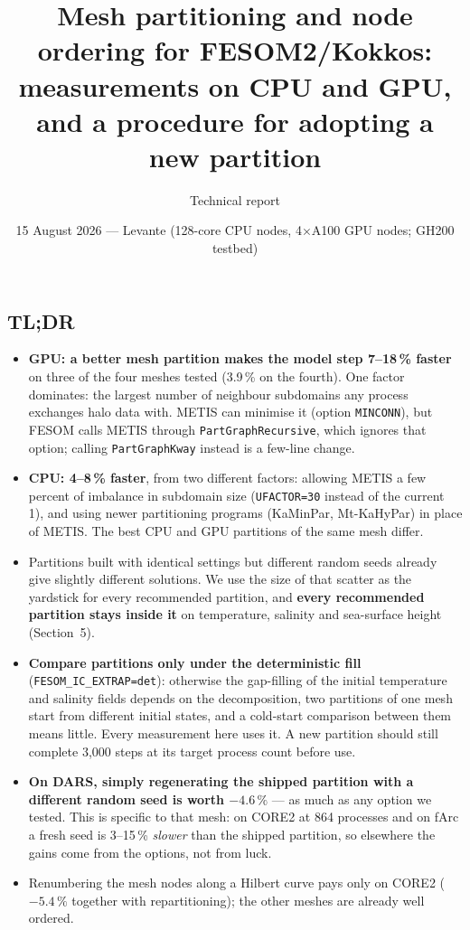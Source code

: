 \documentclass[11pt,a4paper]{article}
\title{\vspace{-12mm}\large\bfseries Mesh partitioning and node ordering for FESOM2/Kokkos:\\
measurements on CPU and GPU, and a procedure for adopting a new partition}
\author{\normalsize Technical report}
\date{\normalsize 15 August 2026 --- Levante (128-core CPU nodes, 4$\times$A100 GPU nodes; GH200 testbed)}
\newcommand{\minconn}{\texttt{MINCONN}}
\begin{document}
\maketitle
\vspace{-6mm}

\subsection*{TL;DR}
\begin{itemize}\itemsep1pt
\item \textbf{GPU: a better mesh partition makes the model step 7--18\,\% faster} on three of
the four meshes tested (3.9\,\% on the fourth). One factor dominates: the largest number of
neighbour subdomains any process exchanges halo data with. METIS can minimise it (option
\minconn), but FESOM calls METIS through \texttt{PartGraphRecursive}, which ignores that
option; calling \texttt{PartGraphKway} instead is a few-line change.
\item \textbf{CPU: 4--8\,\% faster}, from two different factors: allowing METIS a few percent
of imbalance in subdomain size (\texttt{UFACTOR=30} instead of the current 1), and using
newer partitioning programs (KaMinPar, Mt-KaHyPar) in place of METIS. The best CPU and GPU
partitions of the same mesh differ.
\item Partitions built with identical settings but different random seeds already give
slightly different solutions. We use the size of that scatter as the yardstick for every
recommended partition, and \textbf{every recommended partition stays inside it} on temperature,
salinity and sea-surface height (Section~5).
\item \textbf{Compare partitions only under the deterministic fill}
(\texttt{FESOM\_IC\_EXTRAP=det}): otherwise the gap-filling of the initial temperature and
salinity fields depends on the decomposition, two partitions of one mesh start from different
initial states, and a cold-start comparison between them means little. Every measurement here
uses it. A new partition should still complete 3{,}000 steps at its target process count
before use.
\item \textbf{On DARS, simply regenerating the shipped partition with a different random seed
is worth $-4.6\,\%$} --- as much as any option we tested. This is specific to that mesh: on
CORE2 at 864 processes and on fArc a fresh seed is 3--15\,\% \emph{slower} than the shipped
partition, so elsewhere the gains come from the options, not from luck.
\item Renumbering the mesh nodes along a Hilbert curve pays only on CORE2 ($-5.4\,\%$
together with repartitioning); the other meshes are already well ordered.
\end{itemize}
\vspace{2pt}
\end{document}
